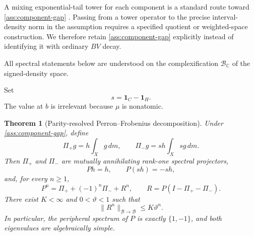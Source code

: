 \documentclass[11pt]{article}
\newtheorem{theorem}{Theorem}[section]
\theoremstyle{definition}
\theoremstyle{remark}
\newcommand{\C}{\mathbb C}
\newcommand{\cB}{\mathcal B}
\newcommand{\one}{\mathbf 1}
\begin{document}
A mixing exponential-tail tower for each component is a standard route toward \cref{ass:component-gap} \citep{Young1992,Baladi2000}.  Passing from a tower operator to the precise interval-density norm in the assumption requires a specified quotient or weighted-space construction.  We therefore retain \cref{ass:component-gap} explicitly instead of identifying it with ordinary $BV$ decay.

All spectral statements below are understood on the complexification $\cB_{\C}$ of the signed-density space.

Set
\begin{equation}\label{eq:parity-sign}
    s=\one_C-\one_H.
\end{equation}
The value at $b$ is irrelevant because $\mu$ is nonatomic.

\begin{theorem}[Parity-resolved Perron--Frobenius decomposition]\label{thm:pf-decomposition}
Under \cref{ass:component-gap}, define
\begin{equation}\label{eq:peripheral-projectors}
    \Pi_+g=h\int_Xg\,dm,
    \qquad
    \Pi_-g=sh\int_Xsg\,dm.
\end{equation}
Then $\Pi_+$ and $\Pi_-$ are mutually annihilating rank-one spectral projectors,
\begin{equation}\label{eq:pf-eigenvectors}
    Ph=h,
    \qquad P(sh)=-sh,
\end{equation}
and, for every $n\ge1$,
\begin{equation}\label{eq:pf-power-decomposition}
    P^n=\Pi_+ +(-1)^n\Pi_-+R^n,
    \qquad
    R=P(I-\Pi_+-\Pi_-).
\end{equation}
There exist $K<\infty$ and $0<\vartheta<1$ such that
\begin{equation}\label{eq:remainder-decay}
    \|R^n\|_{\cB\to\cB}\le K\vartheta^n.
\end{equation}
In particular, the peripheral spectrum of $P$ is exactly $\{1,-1\}$, and both eigenvalues are algebraically simple.
\end{theorem}
\end{document}
